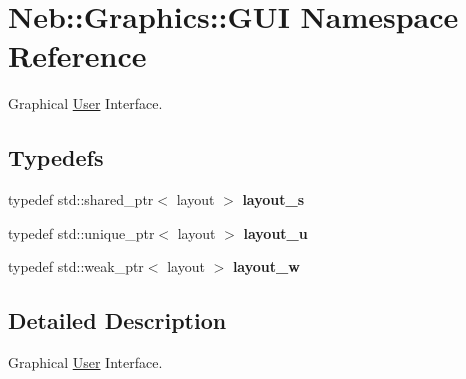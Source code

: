 \hypertarget{namespaceNeb_1_1Graphics_1_1GUI}{\section{Neb\-:\-:Graphics\-:\-:G\-U\-I Namespace Reference}
\label{namespaceNeb_1_1Graphics_1_1GUI}
}


Graphical \hyperlink{classNeb_1_1User}{User} Interface.  


\subsection*{Typedefs}
\begin{DoxyCompactItemize}
\item 
\hypertarget{namespaceNeb_1_1Graphics_1_1GUI_abf1f53b9532148d1be37d60ecc12099c}{typedef std\-::shared\-\_\-ptr$<$ layout $>$ {\bfseries layout\-\_\-s}}\label{namespaceNeb_1_1Graphics_1_1GUI_abf1f53b9532148d1be37d60ecc12099c}

\item 
\hypertarget{namespaceNeb_1_1Graphics_1_1GUI_a7348abb44b8b7cabf7b71d9f8de5a4a9}{typedef std\-::unique\-\_\-ptr$<$ layout $>$ {\bfseries layout\-\_\-u}}\label{namespaceNeb_1_1Graphics_1_1GUI_a7348abb44b8b7cabf7b71d9f8de5a4a9}

\item 
\hypertarget{namespaceNeb_1_1Graphics_1_1GUI_aed7a6107b88523a21a58bc4baa4ab128}{typedef std\-::weak\-\_\-ptr$<$ layout $>$ {\bfseries layout\-\_\-w}}\label{namespaceNeb_1_1Graphics_1_1GUI_aed7a6107b88523a21a58bc4baa4ab128}

\end{DoxyCompactItemize}


\subsection{Detailed Description}
Graphical \hyperlink{classNeb_1_1User}{User} Interface. 